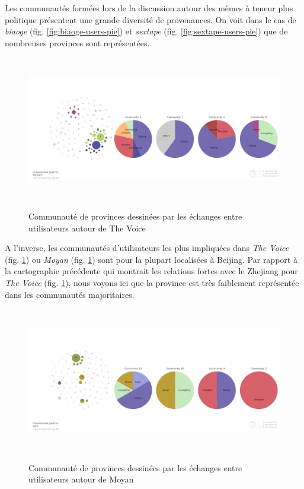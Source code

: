 Les communaut\'es form\'ees lors de la discussion autour des m\`emes \`a
teneur plus politique pr\'esentent une grande diversit\'e de
provenances. On voit dans le cas de \textit{biaoge} (fig. \ref{fig:biaoge-users-pie}) et \textit{sextape} (fig. \ref{fig:sextape-users-pie}) que de nombreuses provinces sont repr\'esent\'ees. 


\begin{figure}[H]
    \centering

    \includegraphics[width=5.9996in,height=2.5004in]{figures/chap4/chapitre4-img56.png}
    \label{fig:voice-users-pie}
  
    \caption{
        Communaut\'e de provinces dessin\'ees par les \'echanges entre utilisateurs autour de The Voice
    }

\end{figure}




A l{\textquoteright}inverse, les communaut\'es
d{\textquoteright}utilisateurs les plus impliqu\'ees dans \textit{The
Voice } (fig. \ref{fig:voice-users-pie}) ou \textit{Moyan} (fig. \ref{fig:voice-users-pie}) sont pour la plupart localis\'ees \`a Beijing.
Par rapport \`a la cartographie pr\'ec\'edente qui montrait les
relations fortes avec le Zhejiang pour \textit{The Voice} (fig. \ref{fig:voice-users-pie}), nous voyons
ici que la province est tr\`es faiblement repr\'esent\'ee dans les
communaut\'es majoritaires.


\begin{figure}[H]
  \centering

   \includegraphics[width=5.9996in,height=2.5004in]{figures/chap4/chapitre4-img57.png}
   \label{fig:moyan-users-pie}
   
    \caption{
        Communaut\'e de provinces dessin\'ees par les \'echanges entre utilisateurs autour de Moyan
    }

\end{figure}


